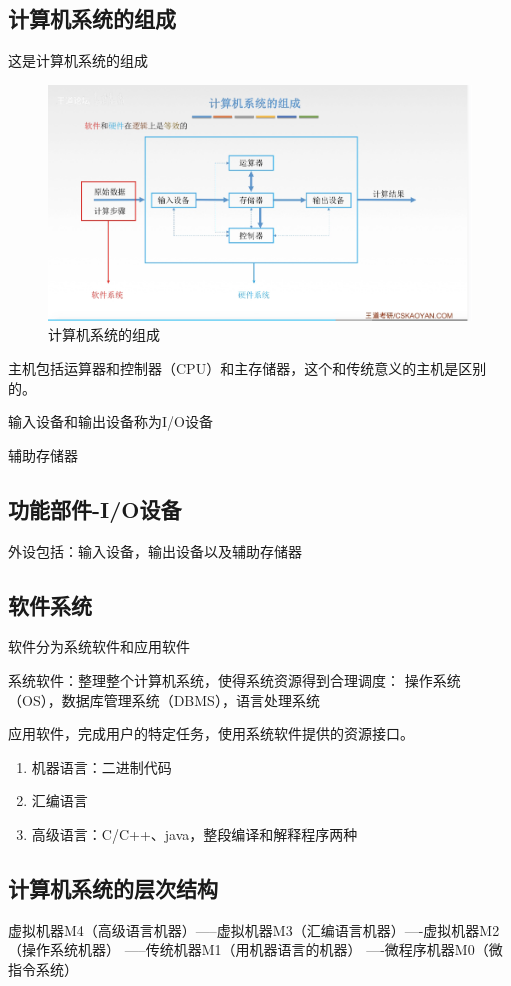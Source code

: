 \documentclass[12pt]{ctexart}
\begin{document}
\subsection{计算机系统的组成}
这是计算机系统的组成
\begin{figure}[htbp]
    \centering
    \includegraphics[scale=0.6]{计算机系统的组成.png}
    \caption{计算机系统的组成}
    \end{figure}
主机包括运算器和控制器（CPU）和主存储器，这个和传统意义的主机是区别的。

输入设备和输出设备称为I/O设备

辅助存储器

\subsection{功能部件-I/O设备}
外设包括：输入设备，输出设备以及辅助存储器

\subsection{软件系统}
软件分为系统软件和应用软件

系统软件：整理整个计算机系统，使得系统资源得到合理调度：
操作系统（OS），数据库管理系统（DBMS），语言处理系统

应用软件，完成用户的特定任务，使用系统软件提供的资源接口。
\begin{enumerate}
    \item 机器语言：二进制代码  
    \item 汇编语言
    \item 高级语言：C/C++、java，整段编译和解释程序两种
\end{enumerate}

\subsection{计算机系统的层次结构}
虚拟机器M4（高级语言机器）-----虚拟机器M3（汇编语言机器）----虚拟机器M2（操作系统机器）
-----传统机器M1（用机器语言的机器）
----微程序机器M0（微指令系统）
\end{document}
